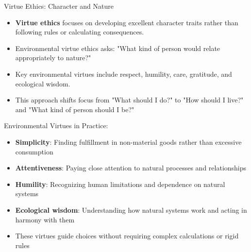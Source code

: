 \documentclass{beamer}
\begin{document}
	\begin{frame}{Virtue Ethics: Character and Nature}
		\begin{itemize}
			\item \textbf{Virtue ethics} focuses on developing excellent character traits rather than following rules or calculating consequences.
			\item Environmental virtue ethics asks: "What kind of person would relate appropriately to nature?"
			\item Key environmental virtues include respect, humility, care, gratitude, and ecological wisdom.
			\item This approach shifts focus from "What should I do?" to "How should I live?" and "What kind of person should I be?"
		\end{itemize}
		
		\begin{example}
			\scriptsize
			Environmental Virtues in Practice:
			\begin{itemize}
				\item \textbf{Simplicity}: Finding fulfillment in non-material goods rather than excessive consumption
				\item \textbf{Attentiveness}: Paying close attention to natural processes and relationships
				\item \textbf{Humility}: Recognizing human limitations and dependence on natural systems
				\item \textbf{Ecological wisdom}: Understanding how natural systems work and acting in harmony with them
				\item These virtues guide choices without requiring complex calculations or rigid rules
			\end{itemize}
		\end{example}
	\end{frame}
	
\end{document}
